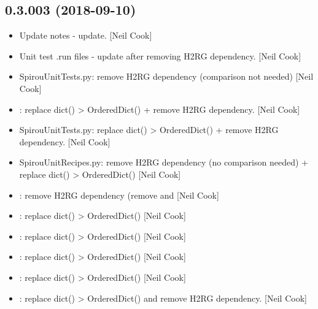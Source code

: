 \documentclass[a4paper,10pt,english]{report}
\begin{document}
\subsection{0.3.003 (2018-09-10)}
\label{\detokenize{misc/changelog:id331}}\begin{itemize}
\item {} 
Update notes - update. {[}Neil Cook{]}

\item {} 
Unit test .run files - update after removing H2RG dependency. {[}Neil
Cook{]}

\item {} 
SpirouUnitTests.py: remove H2RG dependency (comparison not needed)
{[}Neil Cook{]}

\item {} 
: replace dict() \textendash{}\textgreater{} OrderedDict() + remove H2RG
dependency. {[}Neil Cook{]}

\item {} 
SpirouUnitTests.py: replace dict() \textendash{}\textgreater{} OrderedDict() + remove H2RG
dependency. {[}Neil Cook{]}

\item {} 
SpirouUnitRecipes.py: remove H2RG dependency (no comparison needed) +
replace dict() \textendash{}\textgreater{} OrderedDict() {[}Neil Cook{]}

\item {} 
: remove H2RG dependency (remove 
and  {[}Neil Cook{]}

\item {} 
: replace dict() \textendash{}\textgreater{} OrderedDict() {[}Neil Cook{]}

\item {} 
: replace dict() \textendash{}\textgreater{} OrderedDict() {[}Neil Cook{]}

\item {} 
: replace dict() \textendash{}\textgreater{} OrderedDict() {[}Neil Cook{]}

\item {} 
: replace dict() \textendash{}\textgreater{} OrderedDict() {[}Neil Cook{]}

\item {} 
: replace dict() \textendash{}\textgreater{} OrderedDict() and remove H2RG
dependency. {[}Neil Cook{]}


\end{itemize}
\end{document}
